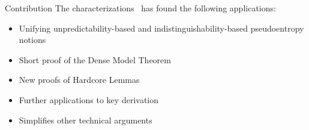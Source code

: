 \documentclass[9pt]{beamer}					%
\begin{document}
\begin{frame}{Contribution}
The characterizations~\cite{DBLP:conf/icits/Skorski15} has found the following applications:
\begin{itemize}
    \item[\emoji{key}] Unifying unpredictability-based and indistinguishability-based pseudoentropy notions~\cite{DBLP:conf/icalp/SkorskiGP15}
    \item[\emoji{key}] Short proof of the Dense Model Theorem~\cite{DBLP:conf/icits/Skorski15a}
    \item[\emoji{key}] New proofs of Hardcore Lemmas~\cite{DBLP:conf/icits/Skorski15a}
    \item[\emoji{key}] Further applications to key derivation~\cite{Skorski17a}
    \item[\emoji{key}] Simplifies other technical arguments~\cite{DBLP:conf/stoc/VadhanZ12}
\end{itemize}
\end{frame}
\end{document}
